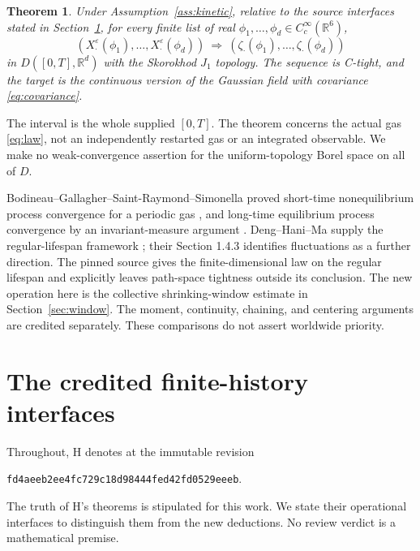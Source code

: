\documentclass[11pt]{article}
\newcommand{\R}{\mathbb R}
\newcommand{\eps}{\varepsilon}
\newtheorem{theorem}{Theorem}[section]
\theoremstyle{definition}\newtheorem{definition}[theorem]{Definition}
\theoremstyle{remark}\newtheorem{remark}[theorem]{Remark}
\numberwithin{equation}{section}
\begin{document}
\begin{theorem}\label{thm:main}
Under Assumption~\ref{ass:kinetic}, relative to the source interfaces stated
in Section~\ref{sec:inputs}, for every finite list of real
$\phi_1,\ldots,\phi_d\in C_c^\infty(\R^6)$,
\[
 (X^\eps_\cdot(\phi_1),\ldots,X^\eps_\cdot(\phi_d))
 \ \Longrightarrow\
 (\zeta_\cdot(\phi_1),\ldots,\zeta_\cdot(\phi_d))
\]
in $D([0,T],\R^d)$ with the Skorokhod $J_1$ topology. The sequence is
C-tight, and the target is the continuous version of the Gaussian field
with covariance \eqref{eq:covariance}.
\end{theorem}
The interval is the whole supplied $[0,T]$. The theorem concerns the actual
gas \eqref{eq:law}, not an independently restarted gas or an integrated
observable. We make no weak-convergence assertion for the uniform-topology
Borel space on all of $D$.

Bodineau--Gallagher--Saint-Raymond--Simonella proved short-time
nonequilibrium process convergence for a periodic gas \cite{BGSSshort},
and long-time equilibrium process convergence by an invariant-measure
argument \cite{BGSSlong}. Deng--Hani--Ma supply the regular-lifespan
framework \cite{DHM}; their Section 1.4.3 identifies fluctuations as a
further direction. The pinned source \cite{H} gives the finite-dimensional
law on the regular lifespan and explicitly leaves path-space tightness
outside its conclusion. The new operation here is the collective
shrinking-window estimate in Section~\ref{sec:window}. The moment,
continuity, chaining, and centering arguments are credited separately.
These comparisons do not assert worldwide priority.

\section{The credited finite-history interfaces}\label{sec:inputs}
Throughout, H denotes \cite{H} at the immutable revision
\begin{center}\texttt{fd4aeeb2ee4fc729c18d98444fed42fd0529eeeb}.\end{center}
The truth of H's theorems is stipulated for this work. We state their
operational interfaces to distinguish them from the new deductions. No
review verdict is a mathematical premise.
\end{document}

